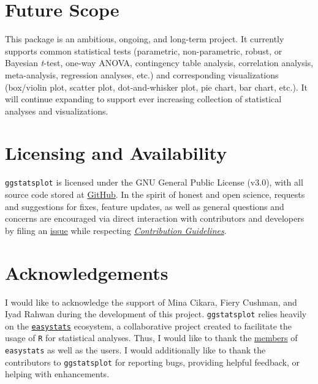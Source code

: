 \documentclass[10pt,a4paper,onecolumn]{article}
\begin{document}
\hypertarget{future-scope}{%
\section{Future Scope}\label{future-scope}}

This package is an ambitious, ongoing, and long-term project. It
currently supports common statistical tests (parametric, non-parametric,
robust, or Bayesian \emph{t}-test, one-way ANOVA, contingency table
analysis, correlation analysis, meta-analysis, regression analyses,
etc.) and corresponding visualizations (box/violin plot, scatter plot,
dot-and-whisker plot, pie chart, bar chart, etc.). It will continue
expanding to support ever increasing collection of statistical analyses
and visualizations.

\hypertarget{licensing-and-availability}{%
\section{Licensing and Availability}\label{licensing-and-availability}}

\texttt{ggstatsplot} is licensed under the GNU General Public License
(v3.0), with all source code stored at
\href{https://github.com/IndrajeetPatil/ggstatsplot/}{GitHub}. In the
spirit of honest and open science, requests and suggestions for fixes,
feature updates, as well as general questions and concerns are
encouraged via direct interaction with contributors and developers by
filing an
\href{https://github.com/IndrajeetPatil/ggstatsplot/issues}{issue} while
respecting
\href{https://indrajeetpatil.github.io/ggstatsplot/CONTRIBUTING.html}{\emph{Contribution
Guidelines}}.

\hypertarget{acknowledgements}{%
\section{Acknowledgements}\label{acknowledgements}}

I would like to acknowledge the support of Mina Cikara, Fiery Cushman,
and Iyad Rahwan during the development of this project.
\texttt{ggstatsplot} relies heavily on the
\href{https://github.com/easystats/easystats}{\texttt{easystats}}
ecosystem, a collaborative project created to facilitate the usage of
\texttt{R} for statistical analyses. Thus, I would like to thank the
\href{https://github.com/orgs/easystats/people}{members} of
\texttt{easystats} as well as the users. I would additionally like to
thank the contributors to \texttt{ggstatsplot} for reporting bugs,
providing helpful feedback, or helping with enhancements.
\end{document}
